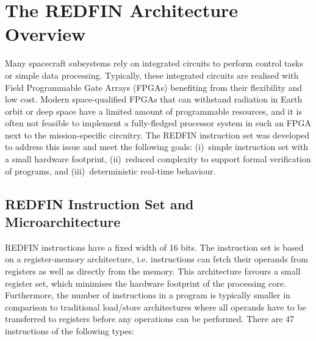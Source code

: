 \section{The REDFIN Architecture Overview\label{sec-redfin}}

Many spacecraft subsystems rely on integrated circuits to perform control tasks
or simple data processing. Typically, these integrated circuits are realised
with Field Programmable Gate Arrays (FPGAs) benefiting from their flexibility
and low cost. Modern space-qualified FPGAs that can withstand radiation in Earth
orbit or deep space have a limited amount of programmable resources, and it is
often not feasible to implement a fully-fledged processor system in such an FPGA
next to the mission-specific circuitry.
The REDFIN instruction set was developed to address this issue and meet the
following goals: (i)~simple instruction set with a small hardware footprint,
(ii)~reduced complexity to support formal verification of programs, and
(iii)~deterministic real-time behaviour.

\subsection{REDFIN Instruction Set and Microarchitecture}

REDFIN instructions have a fixed width of 16 bits.
The instruction set is based on a register-memory architecture, i.e.
instructions can fetch their operands from registers as well as directly from the
memory. This architecture favours a small register set, which minimises the hardware
footprint of the processing core. Furthermore, the number of instructions in a
program is typically smaller in comparison to traditional load/store architectures
where all operands have to be transferred to registers before any operations can
be performed. There are 47 instructions of the following types:

